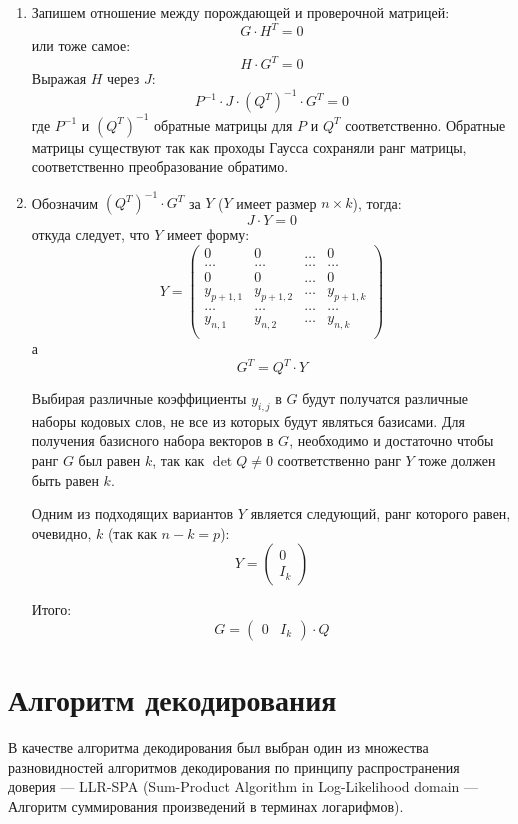 \begin{enumerate}
 	\item Запишем отношение между порождающей и проверочной матрицей:
 	 \[
 	 	G \cdot H^T = 0
 	 \]
 	 или тоже самое:
 	 \[
 	 	H \cdot G^T = 0
 	 \]
 	 Выражая $H$ через $J$:
 	 \[
 	 	P^{-1} \cdot J \cdot (Q^T)^{-1} \cdot G^T = 0
 	 \]
 	 где $P^{-1}$ и $(Q^T)^{-1}$ обратные матрицы для $P$ и $Q^T$ соответственно. Обратные матрицы существуют
 	 так как проходы Гаусса сохраняли ранг матрицы, соответственно преобразование обратимо.
 	 
 	 \item Обозначим $(Q^T)^{-1} \cdot G^T$ за $Y$ ($Y$ имеет размер $n\times k$), тогда:
 	\[
 		J \cdot Y = 0
 	\]
 	откуда следует, что $Y$ имеет форму:
 	\[
 		Y=\begin{pmatrix}
 			0 & 0 & \ldots & 0 \\
 			\ldots & \ldots & \ldots & \ldots \\
 			0 & 0 & \ldots & 0 \\
 			y_{p+1,1} & y_{p+1,2} & \ldots & y_{p+1,k} \\
 			\ldots & \ldots & \ldots & \ldots \\
 			y_{n,1} & y_{n,2} & \ldots & y_{n,k} \\
 		\end{pmatrix}
 	\]
 	а
 	\[
 	G^T = Q^T \cdot Y
 	\]
 	
 	Выбирая различные коэффициенты $y_{i,j}$ в $G$ будут получатся различные наборы кодовых слов,
 	не все из которых будут являться базисами. Для получения базисного набора векторов в $G$, необходимо
 	и достаточно чтобы ранг $G$ был равен $k$, так как $\det Q \neq 0$ соответственно
 	 ранг $Y$ тоже должен быть равен $k$.
 	
 	Одним из подходящих вариантов $Y$ является следующий, ранг которого равен, 
 	очевидно, $k$ (так как $n - k = p$):
 	\[
 		Y=\begin{pmatrix}
 			0 \\
 			I_k
 		\end{pmatrix}
 	\]
 	
 	Итого:
 	\[
 	G=\begin{pmatrix}
 		0 & I_k
 	\end{pmatrix} \cdot Q
 	\] 
 \end{enumerate}

\section{Алгоритм декодирования}

В качестве алгоритма декодирования был выбран один из множества разновидностей алгоритмов декодирования
по принципу распространения доверия --- LLR-SPA (Sum-Product Algorithm in Log-Likelihood domain
--- Алгоритм суммирования произведений в терминах логарифмов).

